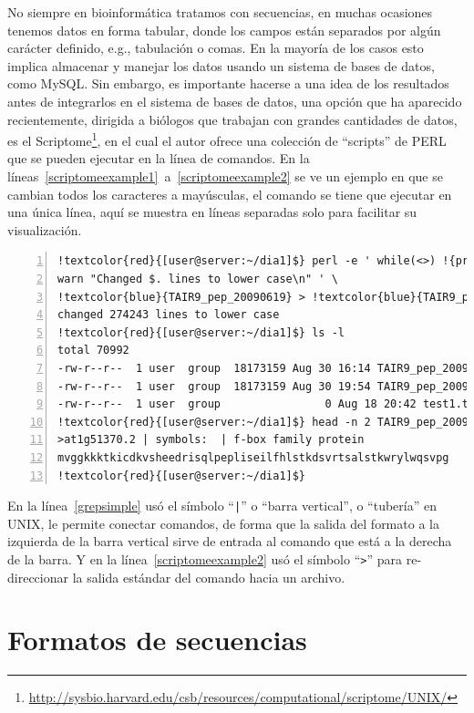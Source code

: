 \documentclass[letter,11pt]{book}
\begin{document}
No siempre en bioinformática tratamos con secuencias, en muchas ocasiones tenemos datos en forma tabular, donde los campos están separados por algún carácter definido, e.g., tabulación o comas. En la mayoría de los casos esto implica almacenar y manejar los datos usando un sistema de bases de datos, como MySQL.  Sin embargo, es importante hacerse a una idea de los resultados antes de integrarlos en el sistema de bases de datos, una opción que ha aparecido recientemente, dirigida a biólogos que trabajan con grandes cantidades de datos, es el Scriptome\footnote{\url{http://sysbio.harvard.edu/csb/resources/computational/scriptome/UNIX/}}, en el cual el autor ofrece una colección de ``scripts'' de PERL que se pueden ejecutar en la línea de comandos. En la líneas~\ref{scriptomeexample1}~a~\ref{scriptomeexample2} se ve un ejemplo en que se cambian todos los caracteres a mayúsculas, el comando se tiene que ejecutar en una única línea, aquí se muestra en líneas separadas solo para facilitar su visualización.

\begin{Verbatim}[commandchars=!\{\},numbers=left,firstnumber=last,label=Ejemplo de Scriptome,frame=topline,fontsize=\scriptsize]
!textcolor{red}{[user@server:~/dia1]$} perl -e ' while(<>) !{print lc($_);!} \  !label{scriptomeexample1}
warn "Changed $. lines to lower case\n" ' \
!textcolor{blue}{TAIR9_pep_20090619} > !textcolor{blue}{TAIR9_pep_20090619.lc}    !label{scriptomeexample2}
changed 274243 lines to lower case
!textcolor{red}{[user@server:~/dia1]$} ls -l
total 70992
-rw-r--r--  1 user  group  18173159 Aug 30 16:14 TAIR9_pep_20090619
-rw-r--r--  1 user  group  18173159 Aug 30 19:54 TAIR9_pep_20090619.lc
-rw-r--r--  1 user  group                0 Aug 18 20:42 test1.txt
!textcolor{red}{[user@server:~/dia1]$} head -n 2 TAIR9_pep_20090619.lc
>at1g51370.2 | symbols:  | f-box family protein
mvggkkktkicdkvsheedrisqlpepliseilfhlstkdsvrtsalstkwrylwqsvpg
!textcolor{red}{[user@server:~/dia1]$} 
\end{Verbatim} 

En la línea~\ref{grepsimple} usó el símbolo ``\Verb+|+'' o ``barra vertical'', o ``tubería'' en UNIX, le permite conectar comandos, de forma que la salida del formato a la izquierda de la barra vertical sirve de entrada al comando que está a la derecha de la barra. Y en la línea~\ref{scriptomeexample2} usó el símbolo ``\Verb+>+'' para re-direccionar la salida estándar del comando hacia un archivo.

\section{Formatos de secuencias\label{sequenceformats}}
\end{document}
